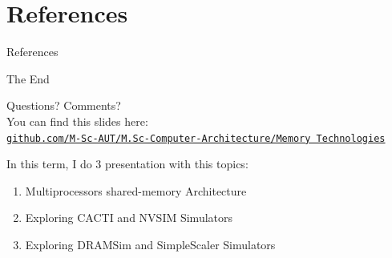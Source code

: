 \documentclass[
	12pt, %
]{beamer}
\begin{document}
\section{References}
\begin{frame}{References}
	
	\hyperlink{start}{}
	
	\nocite{bibitem1}
	\nocite{*}
	 
	
	
\end{frame}



\begin{frame}[plain] %
	\begin{center}
		{\Huge The End}
		
		\bigskip\bigskip %
		
		{\LARGE Questions? Comments?}\\
		You can find this slides here:\\
		\textcolor{blue}{\href{https://github.com/M-Sc-AUT/M.Sc-Computer-Architecture/tree/main/Memory Technologies}{\texttt{github.com/M-Sc-AUT/M.Sc-Computer-Architecture/Memory Technologies}}}
		
		In this term, I do 3 presentation with this topics:
		\begin{enumerate}
			\item Multiprocessors shared-memory Architecture
			\item Exploring CACTI and NVSIM Simulators
			\item Exploring DRAMSim and SimpleScaler Simulators
		\end{enumerate}
	\end{center}
\end{frame}

\end{document}
